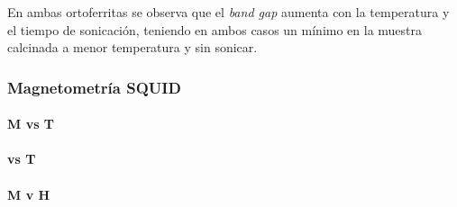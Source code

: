 \documentclass[../main.tex]{subfiles}
\begin{document}
En ambas ortoferritas se observa que el \textit{band gap} aumenta con la temperatura y el tiempo de sonicación, teniendo en ambos casos un mínimo en la muestra calcinada a menor temperatura y sin sonicar.
\subsubsection{Magnetometría SQUID}

\paragraph{M vs T}

\paragraph{\textchi{} vs T}

\paragraph{M v H}
\end{document}
